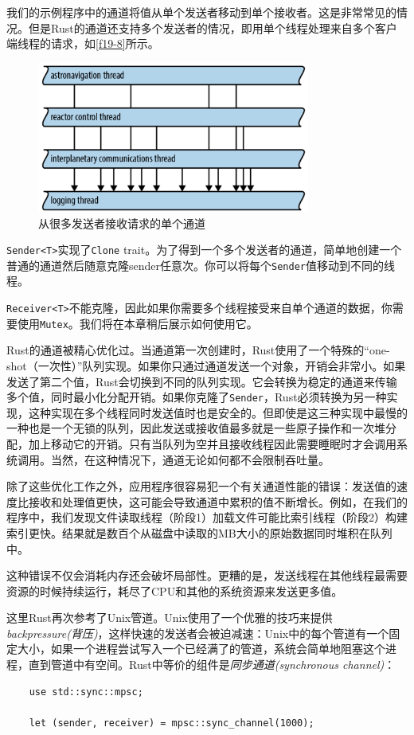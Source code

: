 我们的示例程序中的通道将值从单个发送者移动到单个接收者。这是非常常见的情况。但是Rust的通道还支持多个发送者的情况，即用单个线程处理来自多个客户端线程的请求，如\autoref{f19-8}所示。

\begin{figure}[htbp]
    \centering
    \includegraphics[width=0.8\textwidth]{../img/f19-8.png}
    \caption{从很多发送者接收请求的单个通道}
    \label{f19-8}
\end{figure}

\texttt{Sender<T>}实现了\texttt{Clone} trait。为了得到一个多个发送者的通道，简单地创建一个普通的通道然后随意克隆sender任意次。你可以将每个\texttt{Sender}值移动到不同的线程。

\texttt{Receiver<T>}不能克隆，因此如果你需要多个线程接受来自单个通道的数据，你需要使用\texttt{Mutex}。我们将在本章稍后展示如何使用它。

Rust的通道被精心优化过。当通道第一次创建时，Rust使用了一个特殊的“one-shot（一次性）”队列实现。如果你只通过通道发送一个对象，开销会非常小。如果发送了第二个值，Rust会切换到不同的队列实现。它会转换为稳定的通道来传输多个值，同时最小化分配开销。如果你克隆了\texttt{Sender}，Rust必须转换为另一种实现，这种实现在多个线程同时发送值时也是安全的。但即使是这三种实现中最慢的一种也是一个无锁的队列，因此发送或接收值最多就是一些原子操作和一次堆分配，加上移动它的开销。只有当队列为空并且接收线程因此需要睡眠时才会调用系统调用。当然，在这种情况下，通道无论如何都不会限制吞吐量。

除了这些优化工作之外，应用程序很容易犯一个有关通道性能的错误：发送值的速度比接收和处理值更快，这可能会导致通道中累积的值不断增长。例如，在我们的程序中，我们发现文件读取线程（阶段1）加载文件可能比索引线程（阶段2）构建索引更快。结果就是数百个从磁盘中读取的MB大小的原始数据同时堆积在队列中。

这种错误不仅会消耗内存还会破坏局部性。更糟的是，发送线程在其他线程最需要资源的时候持续运行，耗尽了CPU和其他的系统资源来发送更多值。

这里Rust再次参考了Unix管道。Unix使用了一个优雅的技巧来提供\emph{backpressure(背压)}，这样快速的发送者会被迫减速：Unix中的每个管道有一个固定大小，如果一个进程尝试写入一个已经满了的管道，系统会简单地阻塞这个进程，直到管道中有空间。Rust中等价的组件是\emph{同步通道(synchronous channel)}：
\begin{verbatim}
    use std::sync::mpsc;

    let (sender, receiver) = mpsc::sync_channel(1000);
\end{verbatim}

